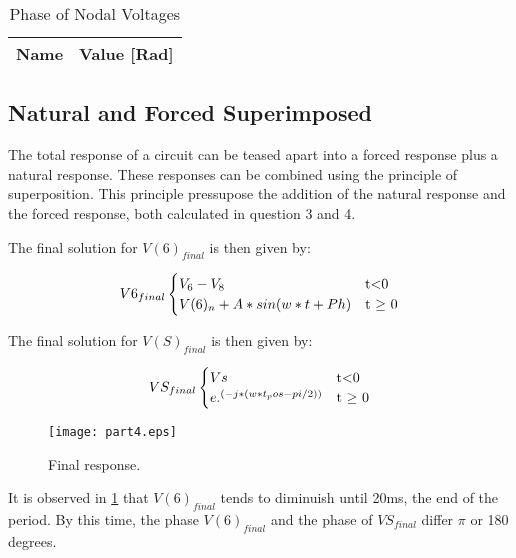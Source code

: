 \begin{table}[ht]

  \centering
  \begin{tabular}{|l|r|}
    \hline    
    {\bf Name} & {\bf Value [Rad]} \\ \hline
    
  \end{tabular}
  \caption{Phase of Nodal Voltages} 
\end{table}




\newpage



\subsection{Natural and Forced Superimposed}


The total response of a circuit can be teased apart into a forced response plus a natural response. These responses can be combined using the principle of superposition. This principle pressupose the addition of the natural response and the forced response, both calculated in question 3 and 4.

The final solution for $V(6)_{final}$  is then given by:


\begin{equation}
V6_{final}
\begin{cases}
V_{6}-V_{8} & $t$ < $0$ \\
V(6)_{n} + A*sin(w*t+Ph) & $t $\geq$ 0$
\end{cases}
\label {eq:n2}
\end{equation}



The final solution for $V(S)_{final}$  is then given by:

\begin{equation}
VS_{final}
\begin{cases}
Vs & $t$ < $0$ \\
e.^{(-j*(w*t_pos-pi/2))}& $t $\geq$ 0$
\end{cases}
\label {eq:n2}
\end{equation}


\begin{figure}[h] \centering
\texttt{[image: part4.eps]}
\caption{Final response.}
\label{fig:part4}
\end{figure}

\par It is observed in \ref{fig:part4} that $V(6)_{final}$ tends to diminuish  until 20ms, the end of the period. By this time, the phase $V(6)_{final}$ and the phase of  $VS_{final}$ differ $\pi$ or 180 degrees.




